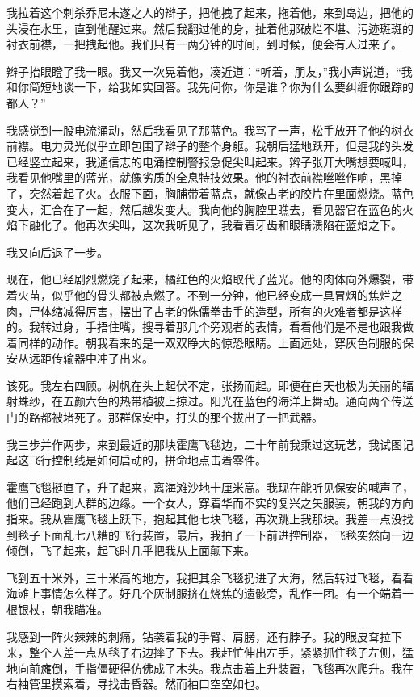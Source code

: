 \documentclass[AutoFakeBold=true]{book}
\begin{document}
我拉着这个刺杀乔尼未遂之人的辫子，把他拽了起来，拖着他，来到岛边，把他的头浸在水里，直到他醒过来。然后我翻过他的身，扯着他那破烂不堪、污迹斑斑的衬衣前襟，一把拽起他。我们只有一两分钟的时间，到时候，便会有人过来了。

辫子抬眼瞪了我一眼。我又一次晃着他，凑近道：``听着，朋友，''我小声说道，``我和你简短地谈一下，给我如实回答。我先问你，你是谁？你为什么要纠缠你跟踪的都人？''

我感觉到一股电流涌动，然后我看见了那蓝色。我骂了一声，松手放开了他的树衣前襟。电力灵光似乎立即包围了辫子的整个身躯。我朝后猛地跃开，但是我的头发已经竖立起来，我通信志的电涌控制警报急促尖叫起来。辫子张开大嘴想要喊叫，我看见他嘴里的蓝光，就像劣质的全息特技效果。他的衬衣前襟咝咝作响，黑掉了，突然着起了火。衣服下面，胸脯带着蓝点，就像古老的胶片在里面燃烧。蓝色变大，汇合在了一起，然后越发变大。我向他的胸腔里瞧去，看见器官在蓝色的火焰下融化了。他再次尖叫，这次我听见了，我看着牙齿和眼睛溃陷在蓝焰之下。

我又向后退了一步。

现在，他已经剧烈燃烧了起来，橘红色的火焰取代了蓝光。他的肉体向外爆裂，带着火苗，似乎他的骨头都被点燃了。不到一分钟，他已经变成一具冒烟的焦烂之肉，尸体缩减得厉害，摆出了古老的侏儒拳击手的造型，所有的火难者都是这样的。我转过身，手捂住嘴，搜寻着那几个旁观者的表情，看看他们是不是也跟我做着同样的动作。朝我看来的是一双双睁大的惊恐眼睛。上面远处，穿灰色制服的保安从远距传输器中冲了出来。

{\kaishu 该死}。我左右四顾。树帆在头上起伏不定，张扬而起。即便在白天也极为美丽的辐射蛛纱，在五颜六色的热带植被上掠过。阳光在蓝色的海洋上舞动。通向两个传送门的路都被堵死了。那群保安中，打头的那个拔出了一把武器。

我三步并作两步，来到最近的那块霍鹰飞毯边，二十年前我乘过这玩艺，我试图记起这飞行控制线是如何启动的，拼命地点击着零件。

霍鹰飞毯挺直了，升了起来，离海滩沙地十厘米高。我现在能听见保安的喊声了，他们已经跑到人群的边缘。一个女人，穿着华而不实的复兴之矢服装，朝我的方向指来。我从霍鹰飞毯上跃下，抱起其他七块飞毯，再次跳上我那块。我差一点没找到毯子下面乱七八糟的飞行装置，最后，我拍了一下前进控制器，飞毯突然向一边倾倒，飞了起来，起飞时几乎把我从上面颠下来。

飞到五十米外，三十米高的地方，我把其余飞毯扔进了大海，然后转过飞毯，看看海滩上事情怎么样了。好几个灰制服挤在烧焦的遗骸旁，乱作一团。有一个端着一根银杖，朝我瞄准。

我感到一阵火辣辣的刺痛，钻袭着我的手臂、肩膀，还有脖子。我的眼皮耷拉下来，整个人差一点从毯子右边摔了下去。我赶忙伸出左手，紧紧抓住毯子左侧，猛地向前瘫倒，手指僵硬得仿佛成了木头。我点击着上升装置，飞毯再次爬升。我在右袖管里摸索着，寻找击昏器。然而袖口空空如也。
\end{document}
